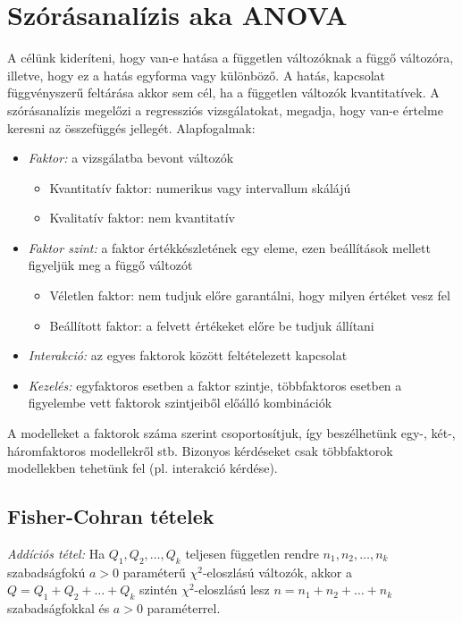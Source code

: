 \chapter{Szórásanalízis aka ANOVA}

A célünk kideríteni, hogy van-e hatása a független változóknak a függő változóra, illetve, hogy ez a hatás egyforma vagy különböző. A hatás, kapcsolat függvényszerű feltárása akkor sem cél, ha a független változók kvantitatívek. A szórásanalízis megelőzi a regressziós vizsgálatokat, megadja, hogy van-e értelme keresni az összefüggés jellegét. Alapfogalmak:
\begin{itemize}
\item \emph{Faktor:} a vizsgálatba bevont változók
\begin{itemize}
\item Kvantitatív faktor: numerikus vagy intervallum skálájú
\item Kvalitatív faktor: nem kvantitatív
\end{itemize}
\item \emph{Faktor szint:} a faktor értékkészletének egy eleme, ezen beállítások mellett figyeljük meg a függő változót
\begin{itemize}
\item Véletlen faktor: nem tudjuk előre garantálni, hogy milyen értéket vesz fel
\item Beállított faktor: a felvett értékeket előre be tudjuk állítani
\end{itemize}
\item \emph{Interakció:} az egyes faktorok között feltételezett kapcsolat
\item \emph{Kezelés:} egyfaktoros esetben a faktor szintje, többfaktoros esetben a figyelembe vett faktorok szintjeiből előálló kombinációk
\end{itemize}

A modelleket a faktorok száma szerint csoportosítjuk, így beszélhetünk egy-, két-, háromfaktoros modellekről stb. Bizonyos kérdéseket csak többfaktorok modellekben tehetünk fel (pl. interakció kérdése).

\section{Fisher-Cohran tételek}

\emph{Addíciós tétel:} Ha $Q_1, Q_2, …, Q_k$ teljesen független rendre $n_1, n_2, …, n_k$ szabadságfokú $a>0$ paraméterű $\chi^2$-eloszlású változók, akkor a $Q= Q_1+ Q_2+ …+ Q_k$ szintén $\chi^2$-eloszlású lesz $n= n_1+ n_2+ …+n_k$ szabadságfokkal és $a>0$ paraméterrel.

